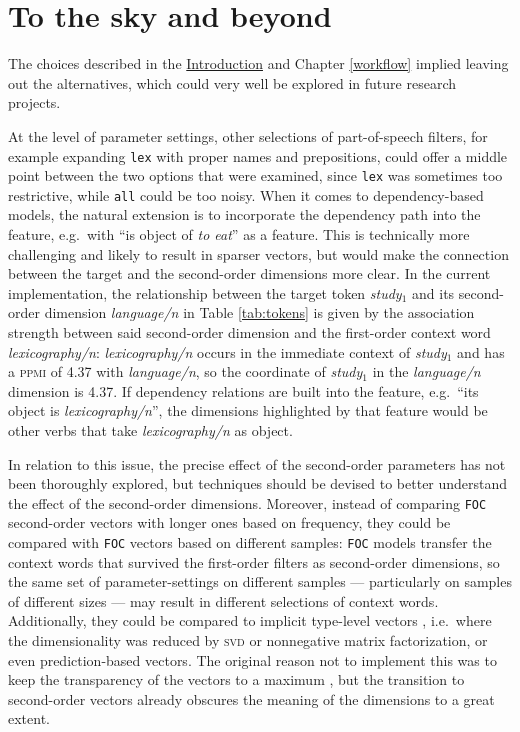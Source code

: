 \documentclass[
]{book}
\begin{document}
\hypertarget{further}{%
\section{To the sky and beyond}\label{further}}

The choices described in the \protect\hyperlink{intro}{Introduction} and Chapter \ref{workflow} implied leaving out the alternatives, which could very well be explored in future research projects.

At the level of parameter settings, other selections of part-of-speech filters, for example expanding \texttt{lex} with proper names and prepositions, could offer a middle point between the two options that were examined, since \texttt{lex} was sometimes too restrictive, while \texttt{all} could be too noisy. When it comes to dependency-based models, the natural extension is to incorporate the dependency path into the feature, e.g.~with ``is object of \emph{to eat}'' as a feature. This is technically more challenging and likely to result in sparser vectors, but would make the connection between the target and the second-order dimensions more clear. In the current implementation, the relationship between the target token \emph{study\(_1\)} and its second-order dimension \emph{language/n} in Table \ref{tab:tokens} is given by the association strength between said second-order dimension and the first-order context word \emph{lexicography/n}: \emph{lexicography/n} occurs in the immediate context of \emph{study\(_1\)} and has a \textsc{ppmi} of 4.37 with \emph{language/n}, so the coordinate of \emph{study\(_1\)} in the \emph{language/n} dimension is 4.37. If dependency relations are built into the feature, e.g.~``its object is \emph{lexicography/n}'', the dimensions highlighted by that feature would be other verbs that take \emph{lexicography/n} as object.

In relation to this issue, the precise effect of the second-order parameters has not been thoroughly explored, but techniques should be devised to better understand the effect of the second-order dimensions. Moreover, instead of comparing \texttt{FOC} second-order vectors with longer ones based on frequency, they could be compared with \texttt{FOC} vectors based on different samples: \texttt{FOC} models transfer the context words that survived the first-order filters as second-order dimensions, so the same set of parameter-settings on different samples --- particularly on samples of different sizes --- may result in different selections of context words. Additionally, they could be compared to implicit type-level vectors \autocite{lenci_2018}, i.e.~where the dimensionality was reduced by \textsc{svd} or nonnegative matrix factorization, or even prediction-based vectors. The original reason not to implement this was to keep the transparency of the vectors to a maximum \autocite{heylen.etal_2015}, but the transition to second-order vectors already obscures the meaning of the dimensions to a great extent.
\end{document}
